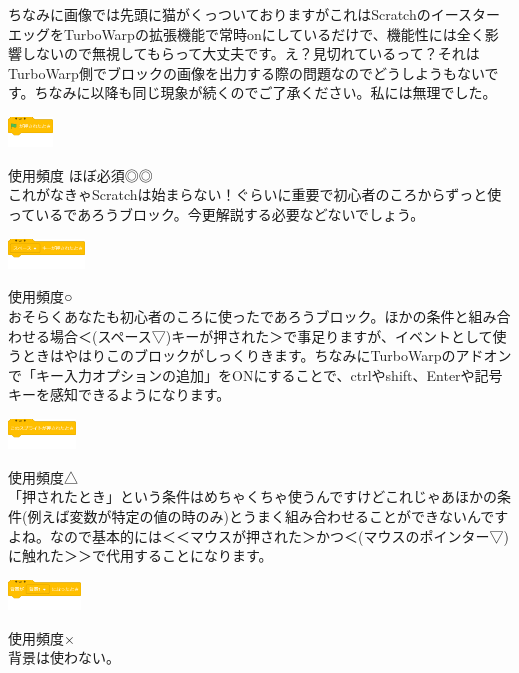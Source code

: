 \documentclass[b5paper,10pt]{jsarticle}
\begin{document}
\begin{multicols*}{3}
ちなみに画像では先頭に猫がくっついておりますがこれはScratchのイースターエッグをTurboWarpの拡張機能で常時onにしているだけで、機能性には全く影響しないので無視してもらって大丈夫です。え？見切れているって？それはTurboWarp側でブロックの画像を出力する際の問題なのでどうしようもないです。ちなみに以降も同じ現象が続くのでご了承ください。私には無理でした。

\begin{itembox}{1}
\includegraphics[height=8mm]{images/events_1.png}
\end{itembox}
使用頻度 ほぼ必須◎◎\\
これがなきゃScratchは始まらない！ぐらいに重要で初心者のころからずっと使っているであろうブロック。今更解説する必要などないでしょう。
\begin{itembox}{2}
\includegraphics[height=8mm]{images/events_2.png}
\end{itembox}
使用頻度○\\
おそらくあなたも初心者のころに使ったであろうブロック。ほかの条件と組み合わせる場合＜(スペース▽)キーが押された＞で事足りますが、イベントとして使うときはやはりこのブロックがしっくりきます。ちなみにTurboWarpのアドオンで「キー入力オプションの追加」をONにすることで、ctrlやshift、Enterや記号キーを感知できるようになります。
\begin{itembox}{3}
\includegraphics[height=8mm]{images/events_3.png}
\end{itembox}
使用頻度△\\
「押されたとき」という条件はめちゃくちゃ使うんですけどこれじゃあほかの条件(例えば変数が特定の値の時のみ)とうまく組み合わせることができないんですよね。なので基本的には＜＜マウスが押された＞かつ＜(マウスのポインター▽)に触れた＞＞で代用することになります。
\begin{itembox}{4}
\includegraphics[height=8mm]{images/events_4.png}
\end{itembox}
使用頻度×\\
背景は使わない。
\begin{itembox}{5}

\end{itembox}
\end{multicols*}
\end{document}
